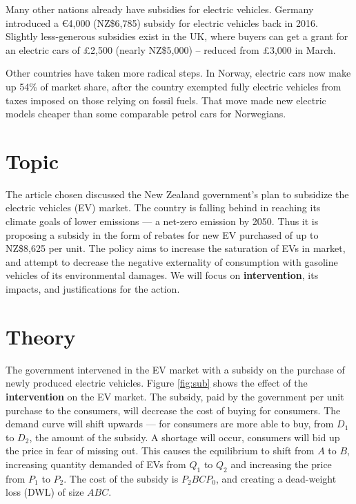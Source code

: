 \documentclass[a4paper,12pt]{article}
\begin{document}
Many other nations already have subsidies for electric vehicles. Germany introduced a €4,000 (NZ\$6,785) subsidy for electric vehicles back in 2016. Slightly less-generous subsidies exist in the UK, where buyers can get a grant for an electric cars of £2,500 (nearly NZ\$5,000) – reduced from £3,000 in March.

Other countries have taken more radical steps. In Norway, electric cars now make up 54\% of market share, after the country exempted fully electric vehicles from taxes imposed on those relying on fossil fuels. That move made new electric models cheaper than some comparable petrol cars for Norwegians.

\newpage

\section*{Topic}
The article chosen discussed the New Zealand government's plan to subsidize the electric vehicles (EV) market. The country is falling behind in reaching its climate goals of lower emissions --- a net-zero emission by 2050. Thus it is proposing a subsidy in the form of rebates for new EV purchased of up to NZ\$8,625 per unit. The policy aims to increase the saturation of EVs in market, and attempt to decrease the negative externality of consumption with gasoline vehicles of its environmental damages. We will focus on \textbf{intervention}, its impacts, and justifications for the action.


\section*{Theory}

The government intervened in the EV market with a subsidy on the purchase of newly produced electric vehicles. Figure \ref{fig:sub} shows the effect of the \textbf{intervention} on the EV market. The subsidy, paid by the government per unit purchase to the consumers, will decrease the cost of buying for consumers. The demand curve will shift upwards --- for consumers are more able to buy, from $D_1$ to $D_2$, the amount of the subsidy. A shortage will occur, consumers will bid up the price in fear of missing out. This causes the equilibrium to shift from $A$ to $B$, increasing quantity demanded of EVs from $Q_1$ to $Q_2$ and increasing the price from $P_1$ to $P_2$. The cost of the subsidy is $P_2BCP_0$, and creating a dead-weight loss (DWL) of size $ABC$.
\end{document}
